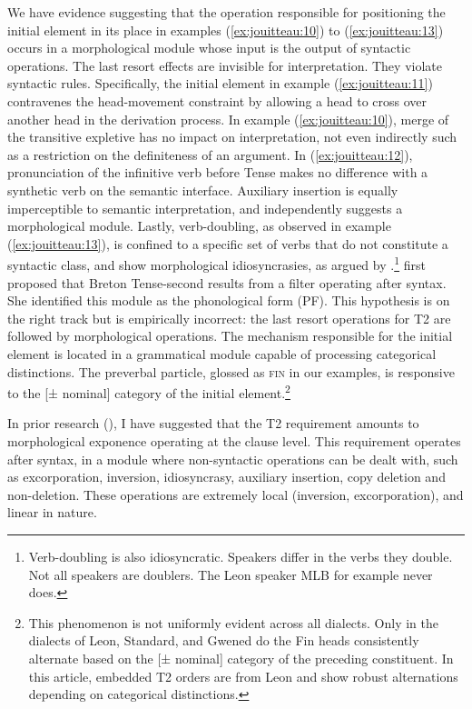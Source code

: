 \documentclass[output=paper,colorlinks,citecolor=brown]{langscibook}
\begin{document}
We have evidence suggesting that the operation responsible for positioning the initial element in its place in examples (\ref{ex:jouitteau:10}) to (\ref{ex:jouitteau:13}) occurs in a morphological module whose input is the output of syntactic operations. The last resort effects are invisible for interpretation. They violate syntactic rules. Specifically, the initial element in example (\ref{ex:jouitteau:11}) contravenes the head-movement constraint \citep{mj:Travis1984} by allowing a head to cross over another head in the derivation process. In example (\ref{ex:jouitteau:10}), merge of the transitive expletive has no impact on interpretation, not even indirectly such as a restriction on the definiteness of an argument. In (\ref{ex:jouitteau:12}), pronunciation of the infinitive verb before Tense makes no difference with a synthetic verb on the semantic interface. Auxiliary insertion is equally imperceptible to semantic interpretation, and independently suggests a morphological module. Lastly, verb-doubling, as observed in example (\ref{ex:jouitteau:13}), is confined to a specific set of verbs that do not constitute a syntactic class, and show morphological idiosyncrasies, as argued by \citet{mj:Jouitteau2020}.\footnote{Verb-doubling is also idiosyncratic. Speakers differ in the verbs they double. Not all speakers are doublers. The Leon speaker MLB for example never does.} \citet{mj:Rivero1999, mj:Rivero2000} first proposed that Breton Tense-second results from a filter operating after syntax. She identified this module as the phonological form (PF). This hypothesis is on the right track but is empirically incorrect: the last resort operations for T2 are followed by morphological operations. The mechanism responsible for the initial element is located in a grammatical module capable of processing categorical distinctions. The preverbal particle, glossed as \textsc{fin} in our examples, is responsive to the [± nominal] category of the initial element.\footnote{This phenomenon is not uniformly evident across all dialects. Only in the dialects of Leon, Standard, and Gwened do the Fin heads consistently alternate based on the [± nominal] category of the preceding constituent. In this article, embedded T2 orders are from Leon and show robust alternations depending on categorical distinctions.} 

In prior research (\cite{mj:Jouitteau2011, mj:Jouitteau2012, mj:Jouitteau2020}), I have suggested that the T2 requirement amounts to morphological exponence operating at the clause level. This requirement operates after syntax, in a module where non-syntactic operations can be dealt with, such as excorporation, inversion, idiosyncrasy, auxiliary insertion, copy deletion and non-deletion. These operations are extremely local (inversion, excorporation), and linear in nature. 
\end{document}
